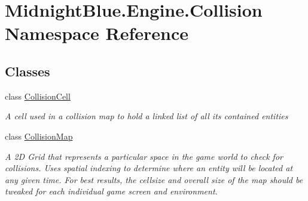 \hypertarget{namespace_midnight_blue_1_1_engine_1_1_collision}{}\section{Midnight\+Blue.\+Engine.\+Collision Namespace Reference}
\label{namespace_midnight_blue_1_1_engine_1_1_collision}
\subsection*{Classes}
\begin{DoxyCompactItemize}
\item 
class \hyperlink{class_midnight_blue_1_1_engine_1_1_collision_1_1_collision_cell}{Collision\+Cell}
\begin{DoxyCompactList}\small\item\em A cell used in a collision map to hold a linked list of all its contained entities \end{DoxyCompactList}\item 
class \hyperlink{class_midnight_blue_1_1_engine_1_1_collision_1_1_collision_map}{Collision\+Map}
\begin{DoxyCompactList}\small\item\em A 2D Grid that represents a particular space in the game world to check for collisions. Uses spatial indexing to determine where an entity will be located at any given time. For best results, the cellsize and overall size of the map should be tweaked for each individual game screen and environment. \end{DoxyCompactList}\end{DoxyCompactItemize}
